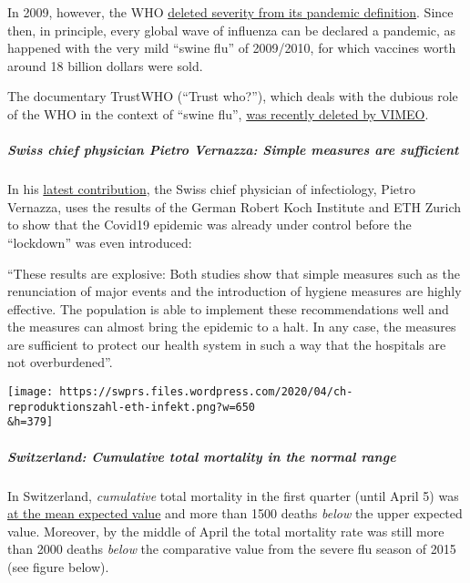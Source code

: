 In 2009, however, the WHO
\href{https://www.forbes.com/2010/02/05/world-health-organization-swine-flu-pandemic-opinions-contributors-michael-fumento.html\#5ae32fb848e8}{deleted
severity from its pandemic definition}. Since then, in principle, every
global wave of influenza can be declared a pandemic, as happened with
the very mild ``swine flu'' of 2009/2010, for which vaccines worth
around 18 billion dollars were sold.

The documentary TrustWHO (``Trust who?''), which deals with the dubious
role of the WHO in the context of ``swine flu'',
\href{https://www.youtube.com/watch?v=VjQGyqVN5RM}{was recently deleted
by VIMEO}.

\hypertarget{swiss-chief-physician-pietro-vernazza-simple-measures-are-sufficient}{%
\subparagraph{\texorpdfstring{\textbf{Swiss chief physician Pietro
Vernazza: Simple measures are
sufficient}}{Swiss chief physician Pietro Vernazza: Simple measures are sufficient}}\label{swiss-chief-physician-pietro-vernazza-simple-measures-are-sufficient}}

In his
\href{https://infekt.ch/2020/04/sind-wir-tatsaechlich-im-blindflug/}{latest
contribution}, the Swiss chief physician of infectiology, Pietro
Vernazza, uses the results of the German Robert Koch Institute and ETH
Zurich to show that the Covid19 epidemic was already under control
before the ``lockdown'' was even introduced:

``These results are explosive: Both studies show that simple measures
such as the renunciation of major events and the introduction of hygiene
measures are highly effective. The population is able to implement these
recommendations well and the measures can almost bring the epidemic to a
halt. In any case, the measures are sufficient to protect our health
system in such a way that the hospitals are not overburdened''.

\texttt{[image: https://swprs.files.wordpress.com/2020/04/ch-reproduktionszahl-eth-infekt.png?w=650\\\&h=379]}

\hypertarget{switzerland-cumulative-total-mortality-in-the-normal-range}{%
\subparagraph{\texorpdfstring{\textbf{Switzerland: Cumulative total
mortality in the normal
range}}{Switzerland: Cumulative total mortality in the normal range}}\label{switzerland-cumulative-total-mortality-in-the-normal-range}}

In Switzerland, \emph{cumulative} total mortality in the first quarter
(until April 5) was
\href{https://swprs.files.wordpress.com/2020/04/ch-sterblichkeit-kumuliert-q1-2020.pdf}{at
the mean expected value} and more than 1500 deaths \emph{below} the
upper expected value. Moreover, by the middle of April the total
mortality rate was still more than 2000 deaths \emph{below} the
comparative value from the severe flu season of 2015 (see figure below).

